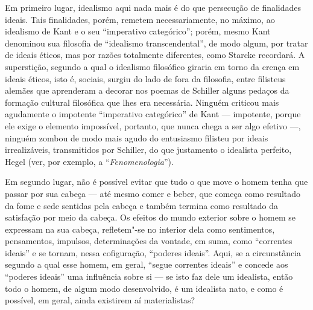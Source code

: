 Em primeiro lugar, idealismo aqui nada mais é do que persecução de
finalidades ideais. Tais finalidades, porém, remetem necessariamente, no
máximo, ao idealismo
de Kant e
o seu ``imperativo categórico''; porém,
mesmo Kant 
denominou sua filosofia de ``idealismo transcendental'', de modo algum,
por tratar de ideais éticos, mas por razões totalmente diferentes,
como Starcke recordará. A superstição, segundo a qual o idealismo
filosófico giraria em torno da crença em ideais éticos, isto é, sociais,
surgiu do lado de fora da filosofia, entre filisteus alemães que
aprenderam a decorar nos poemas
de Schiller alguns
pedaços da formação cultural filosófica que lhes era necessária. Ninguém
criticou mais agudamente o impotente ``imperativo categórico''
de Kant ---
impotente, porque ele exige o elemento impossível, portanto, que nunca
chega a ser algo efetivo ---, ninguém zombou de modo mais agudo do
entusiasmo filisteu por ideais irrealizáveis, transmitidos
por Schiller,
do que justamento o idealista perfeito, Hegel (ver, por exemplo,
a ``\emph{Fenomenologia}'').

Em segundo lugar, não é possível evitar que tudo o que move o homem
tenha que passar por sua cabeça --- até mesmo comer e beber, que começa
como resultado da fome e sede sentidas pela cabeça e também termina como
resultado da satisfação por meio da cabeça. Os efeitos do mundo exterior
sobre o homem se expressam na sua cabeça, refletem"-se no interior dela
como sentimentos, pensamentos, impulsos, determinações da vontade, em
suma, como ``correntes ideais'' e se tornam, nessa cofiguração,
``poderes ideais''. Aqui, se a circunstância segundo a qual esse homem,
em geral, ``segue correntes ideais'' e concede aos ``poderes ideais''
uma influência sobre si --- se isto faz dele um idealista, então todo o
homem, de algum modo desenvolvido, é um idealista nato, e como é
possível, em geral, ainda existirem aí materialistas?

